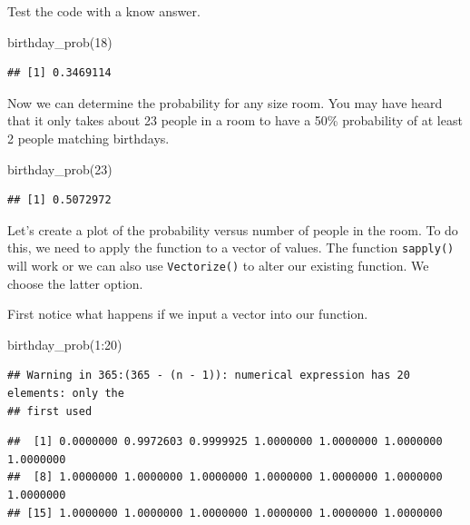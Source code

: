 \documentclass[
]{book}
\newenvironment{Shaded}{\begin{snugshade}}{\end{snugshade}}
\newcommand{\DecValTok}[1]{\textcolor[rgb]{0.00,0.00,0.81}{#1}}
\newcommand{\FunctionTok}[1]{\textcolor[rgb]{0.00,0.00,0.00}{#1}}
\newcommand{\NormalTok}[1]{#1}
\newcommand{\SpecialCharTok}[1]{\textcolor[rgb]{0.00,0.00,0.00}{#1}}
\begin{document}
Test the code with a know answer.

\begin{Shaded}
\begin{Highlighting}[]
\FunctionTok{birthday\_prob}\NormalTok{(}\DecValTok{18}\NormalTok{)}
\end{Highlighting}
\end{Shaded}

\begin{verbatim}
## [1] 0.3469114
\end{verbatim}

Now we can determine the probability for any size room. You may have heard that it only takes about 23 people in a room to have a 50\% probability of at least 2 people matching birthdays.

\begin{Shaded}
\begin{Highlighting}[]
\FunctionTok{birthday\_prob}\NormalTok{(}\DecValTok{23}\NormalTok{)}
\end{Highlighting}
\end{Shaded}

\begin{verbatim}
## [1] 0.5072972
\end{verbatim}

Let's create a plot of the probability versus number of people in the room. To do this, we need to apply the function to a vector of values. The function \texttt{sapply()} will work or we can also use \texttt{Vectorize()} to alter our existing function. We choose the latter option.

First notice what happens if we input a vector into our function.

\begin{Shaded}
\begin{Highlighting}[]
\FunctionTok{birthday\_prob}\NormalTok{(}\DecValTok{1}\SpecialCharTok{:}\DecValTok{20}\NormalTok{)}
\end{Highlighting}
\end{Shaded}

\begin{verbatim}
## Warning in 365:(365 - (n - 1)): numerical expression has 20 elements: only the
## first used
\end{verbatim}

\begin{verbatim}
##  [1] 0.0000000 0.9972603 0.9999925 1.0000000 1.0000000 1.0000000 1.0000000
##  [8] 1.0000000 1.0000000 1.0000000 1.0000000 1.0000000 1.0000000 1.0000000
## [15] 1.0000000 1.0000000 1.0000000 1.0000000 1.0000000 1.0000000
\end{verbatim}
\end{document}
